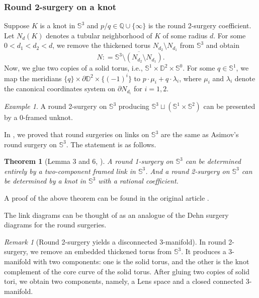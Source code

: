 \documentclass{amsart}
\theoremstyle{plain}
\newtheorem{thm}{Theorem}
\theoremstyle{remark}
\newtheorem{rem}{Remark}
\newtheorem{exm}{Example}
\theoremstyle{definition}
\newcommand{\s}{\mathbb{S}}
\newcommand{\D}{\mathbb{D}}
\begin{document}
\subsubsection{Round 2-surgery on a knot}
Suppose $K$ is a knot in $\s^3$ and $p/q\in \mathbb{Q}\cup \{\infty\}$ is the round 2-surgery coefficient. 
Let $N_d(K)$ denotes a tubular neighborhood of $K$ of some radius $d$. 
For some $0<d_1 < d_2 < d$, we remove the thickened torus $N_{d_2} \setminus N_{d_1}$ from $\s^3$ and obtain
$$N : = \overline{\s^3 \setminus \left(N_{d_2} \setminus N_{d_1}\right)}.$$
Now, we glue two copies of a solid torus, i.e., $\s^1 \times \D^2 \times \s^0$. 
For some $q \in \s^1$, we map the meridians $\{q\}\times \partial \D^2 \times \{(-1)^i\}$ to $p \cdot \mu_i + q \cdot \lambda_i$, where $\mu_i$ and $\lambda_i$ denote the canonical coordinates system on $\partial N_{d_i}$ for $i=1,2$. 

\begin{exm}\label{exm: R2SD}
A round 2-surgery on $\s^3$ producing $\s^3 \sqcup (\s^1 \times \s^2)$ can be presented by a $0$-framed unknot. 
\end{exm}



In \cite{PD-RSD}, we proved that round surgeries on links on $\s^3$ are the same as Asimov's round surgery on $\s^3$. 
The statement is as follows. 
\begin{thm}[Lemma 3 and 6, \cite{PD-RSD}]\label{Thm: RSD}
A round 1-surgery on $\s^3$ can be determined entirely by a two-component framed link in $\s^3$. And a round 2-surgery on $\mathbb{S}^3$ can be determined by a knot in $\s^3$ with a rational coefficient. 
\end{thm}

A proof of the above theorem can be found in the original article \cite{PD-RSD}. 



The link diagrams can be thought of as an analogue of the Dehn surgery diagrams for the round surgeries. 

 
\begin{rem}[Round 2-surgery yields a disconnected 3-manifold]
In round 2-surgery, we remove an embedded thickened torus from $\s^3$. 
It produces a 3-manifold with two components: one is the solid torus, and the other is the knot complement of the core curve of the solid torus. After gluing two copies of solid tori, we obtain two components, namely, a Lens space and a closed connected 3-manifold.
\end{rem}
\end{document}

